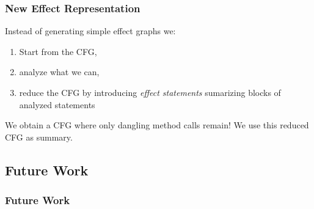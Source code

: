 \documentclass[hyperref={pdfpagelabels=false}]{beamer}
\begin{document}
\begin{frame}[fragile]
\frametitle{New Effect Representation}
    Instead of generating simple effect graphs we:
    \begin{enumerate}
        \item Start from the CFG,
        \item analyze what we can,
        \item reduce the CFG by introducing \emph{effect statements} sumarizing
        blocks of analyzed statements
    \end{enumerate}

    \vspace{15pt}

    We obtain a CFG where only dangling method calls remain! We use this
    reduced CFG as summary.

\end{frame}

\subsection{Future Work}

\begin{frame}[fragile]
\frametitle{Future Work}


\end{frame}
\end{document}
